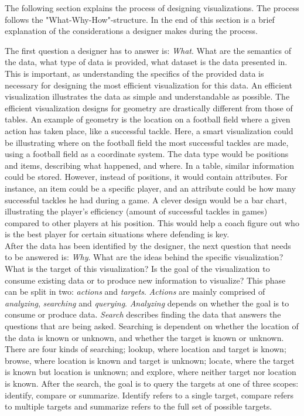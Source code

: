 \documentclass[Report.tex]{subfiles}
\begin{document}
The following section explains the process of designing visualizations. The process follows the "What-Why-How"-structure. In the end of this section is a brief explanation of the considerations a designer makes during the process.

The first question a designer has to answer is: \emph{What}. What are the semantics of the data, what type of data is provided, what dataset is the data presented in. This is important, as understanding the specifics of the provided data is necessary for designing the most efficient visualization for this data. An efficient visualization illustrates the data as simple and understandable as possible. The efficient visualization designs for geometry are drastically different from those of tables. An example of geometry is the location on a football field where a given action has taken place, like a successful tackle. Here, a smart visualization could be illustrating where on the football field the most successful tackles are made, using a football field as a coordinate system. The data type would be positions and items, describing what happened, and where. In a table, similar information could be stored. However, instead of positions, it would contain attributes. For instance, an item could be a specific player, and an attribute could be how many successful tackles he had during a game. A clever design would be a bar chart, illustrating the player’s efficiency (amount of successful tackles in games) compared to other players at his position. This would help a coach figure out who is the best player for certain situations where defending is key.\\
After the data has been identified by the designer, the next question that needs to be answered is: \emph{Why}. What are the ideas behind the specific visualization? What is the target of this visualization? Is the goal of the visualization to consume existing data or to produce new information to visualize? This phase can be split in two: \emph{actions} and \emph{targets}. \emph{Actions} are mainly comprised of \emph{analyzing}, \emph{searching} and \emph{querying}. \emph{Analyzing} depends on whether the goal is to consume or produce data. \emph{Search} describes finding the data that answers the questions that are being asked. Searching is dependent on whether the location of the data is known or unknown, and whether the target is known or unknown. There are four kinds of searching; lookup, where location and target is known; browse, where location is known and target is unknown; locate, where the target is known but location is unknown; and explore, where neither target nor location is known. After the search, the goal is to query the targets at one of three scopes: identify, compare or summarize. Identify refers to a single target, compare refers to multiple targets and summarize refers to the full set of possible targets.
\end{document}
